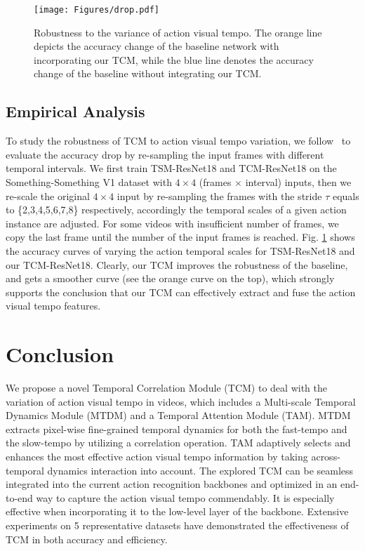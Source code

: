\documentclass[journal]{IEEEtran}
\begin{document}
\begin{figure}[!htbp]
  \texttt{[image: Figures/drop.pdf]}
  \caption{Robustness to the variance of action visual tempo. The orange line depicts the accuracy change of the baseline network with incorporating our TCM, while the blue line denotes the accuracy change of the baseline without integrating our TCM.}
  \label{fig:drop}
\end{figure}

\subsection{Empirical Analysis}
To study the robustness of TCM to action visual tempo variation, we follow~\cite{yang2020temporal} to evaluate the accuracy drop by re-sampling the input frames with different temporal intervals. We first train TSM-ResNet18 and TCM-ResNet18 on the Something-Something V1 dataset with $4 \times 4$ (frames $\times$ interval) inputs, then we re-scale the original $4\times4$ input by re-sampling the frames with the stride $\tau$ equals to \{2,3,4,5,6,7,8\} respectively, accordingly the temporal scales of a given action instance are adjusted. For some videos with insufficient number of frames, we copy the last frame until the number of the input frames is reached. Fig. \ref{fig:drop} shows the accuracy curves of varying the action temporal scales for TSM-ResNet18 and our TCM-ResNet18. Clearly, our TCM improves the robustness of the baseline, and gets a smoother curve (see the orange curve on the top), which strongly supports the conclusion that our TCM can effectively extract and fuse the action visual tempo features.

\section{Conclusion}
We propose a novel Temporal Correlation Module (TCM) to deal with the variation of action visual tempo in videos, which includes a Multi-scale Temporal Dynamics Module (MTDM) and a Temporal Attention Module (TAM). MTDM extracts pixel-wise fine-grained temporal dynamics for both the fast-tempo and the slow-tempo by utilizing a correlation operation. TAM adaptively selects and enhances the most effective action visual tempo information by taking across-temporal dynamics interaction into account. The explored TCM can be seamless integrated into the current action recognition backbones and optimized in an end-to-end way to capture the action visual tempo commendably. It is especially effective when incorporating it to the low-level layer of the backbone. Extensive experiments on 5 representative datasets have demonstrated the effectiveness of TCM in both accuracy and efficiency.
\end{document}

